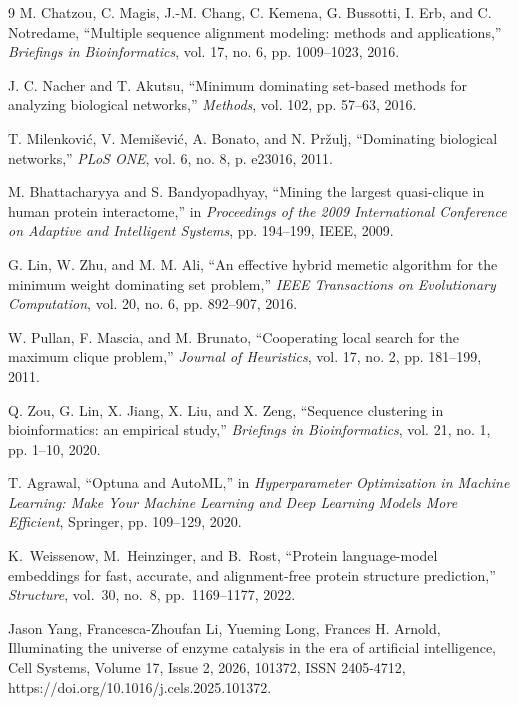 \documentclass[runningheads]{llncs}
\begin{document}
\begin{thebibliography}{9}
	 	M. Chatzou, C. Magis, J.-M. Chang, C. Kemena, G. Bussotti, I. Erb, and C. Notredame,
	 	``Multiple sequence alignment modeling: methods and applications,''
	 	\textit{Briefings in Bioinformatics},
	 	vol. 17, no. 6, pp. 1009--1023, 2016.
	 	
	 	
	 	J. C. Nacher and T. Akutsu,
	 	``Minimum dominating set-based methods for analyzing biological networks,''
	 	\textit{Methods},
	 	vol. 102, pp. 57--63, 2016.
	 	
	 	T. Milenković, V. Memišević, A. Bonato, and N. Pržulj,
	 	``Dominating biological networks,''
	 	\textit{PLoS ONE},
	 	vol. 6, no. 8, p. e23016, 2011.
	 	
	 	M. Bhattacharyya and S. Bandyopadhyay,
	 	``Mining the largest quasi-clique in human protein interactome,''
	 	in \textit{Proceedings of the 2009 International Conference on Adaptive and Intelligent Systems},
	 	pp. 194--199, IEEE, 2009.
	 	
	 	G. Lin, W. Zhu, and M. M. Ali,
	 	``An effective hybrid memetic algorithm for the minimum weight dominating set problem,''
	 	\textit{IEEE Transactions on Evolutionary Computation},
	 	vol. 20, no. 6, pp. 892--907, 2016.
	 	
	 	W. Pullan, F. Mascia, and M. Brunato,
	 	``Cooperating local search for the maximum clique problem,''
	 	\textit{Journal of Heuristics},
	 	vol. 17, no. 2, pp. 181--199, 2011.
	 	
	 	Q. Zou, G. Lin, X. Jiang, X. Liu, and X. Zeng,
	 	``Sequence clustering in bioinformatics: an empirical study,''
	 	\textit{Briefings in Bioinformatics},
	 	vol. 21, no. 1, pp. 1--10, 2020.
	 	
	 	T. Agrawal,
	 	``Optuna and AutoML,''
	 	in \textit{Hyperparameter Optimization in Machine Learning: Make Your Machine Learning and Deep Learning Models More Efficient},
	 	Springer, pp. 109--129, 2020.
	 	
	 	K.~Weissenow, M.~Heinzinger, and B.~Rost,
	 	``Protein language-model embeddings for fast, accurate, and alignment-free protein structure prediction,''
	 	\textit{Structure}, vol.~30, no.~8, pp.~1169--1177, 2022.
	 	
	 	 Jason Yang, Francesca-Zhoufan Li, Yueming Long, Frances H. Arnold,
	 	Illuminating the universe of enzyme catalysis in the era of artificial intelligence,
	 	Cell Systems,
	 	Volume 17, Issue 2,
	 	2026,
	 	101372,
	 	ISSN 2405-4712,
	 	https://doi.org/10.1016/j.cels.2025.101372.
	 	
	 \end{thebibliography}
 
\end{document}
